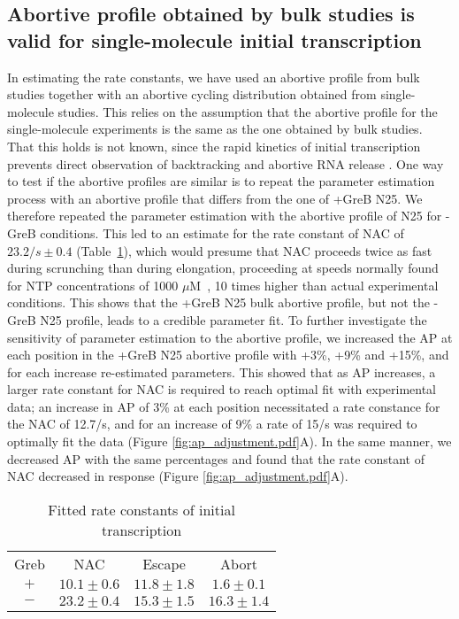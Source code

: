 \subsection{Abortive profile obtained by bulk studies is valid for
single-molecule initial transcription}
In estimating the rate constants, we have used an abortive profile from
bulk studies together with an abortive cycling distribution obtained from
single-molecule studies. This relies on the assumption that the abortive
profile for the single-molecule experiments is the same as the one obtained by
bulk studies. That this holds is not known, since the rapid kinetics of
initial transcription prevents direct observation of backtracking and abortive
RNA release \cite{margeat_direct_2006, revyakin_abortive_2006}. One way to
test if the abortive profiles are similar is to repeat the parameter
estimation process with an abortive profile that differs from the one of +GreB
N25. We therefore repeated the parameter estimation with the abortive profile
of N25 for -GreB conditions. This led to an estimate for the rate constant of
NAC of $23.2/s \pm 0.4$ (Table~\ref{tab:param_fit_revyakin}), which would
presume that NAC proceeds twice as fast during scrunching than during
elongation, proceeding at speeds normally found for NTP concentrations of 1000
$\mu$M~\cite{bai_mechanochemical_2007}, 10 times higher than actual
experimental conditions. This shows that the +GreB N25 bulk abortive
profile, but not the -GreB N25 profile, leads to a credible parameter fit. To
further investigate the sensitivity of parameter estimation to the abortive
profile, we increased the AP at each position in the +GreB N25 abortive
profile with +3\%, +9\% and +15\%, and for each increase re-estimated
parameters. This showed that as AP increases, a larger rate constant for NAC
is required to reach optimal fit with experimental data; an increase in AP of
3\% at each position necessitated a rate constance for the NAC of 12.7/s, and
for an increase of 9\% a rate of 15/s was required to optimally fit the data
(Figure \ref{fig:ap_adjustment.pdf}A). In the same manner, we decreased AP
with the same percentages and found that the rate constant of NAC decreased in
response (Figure \ref{fig:ap_adjustment.pdf}A).

\begin{table}
  \label{tab:param_fit_revyakin}
  \caption{Fitted rate constants of initial transcription}
  \begin{center}
    \begin{tabular}{cccc}
       \toprule
       Greb & NAC & Escape & Abort \\
       $+$ & $10.1 \pm 0.6$ & $11.8 \pm 1.8$ & $1.6 \pm 0.1$ \\
       $-$ & $23.2 \pm 0.4$ & $15.3 \pm 1.5$ & $16.3 \pm 1.4$ \\
    \end{tabular}
  \end{center}
\end{table}


